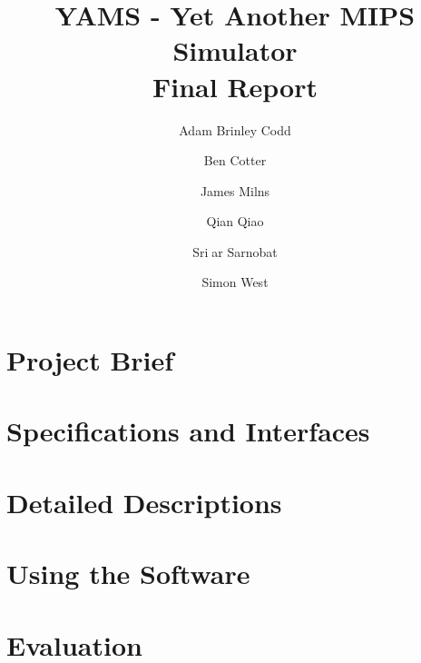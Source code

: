 \documentclass[]{report}
\begin{document}
\title{YAMS - Yet Another MIPS Simulator
\\Final Report}
\author{Adam Brinley Codd
\and
Ben Cotter
\and
James Milns
\and
Qian Qiao
\and
Sri ar Sarnobat
\and
Simon West}
\maketitle



\tableofcontents
\thispagestyle{empty}

\newpage

\listoffigures

\listoftables


\chapter{Project Brief}


\chapter{Specifications and Interfaces}


\chapter{Detailed Descriptions}


\chapter{Using the Software}


\chapter{Evaluation}

\end{document}
